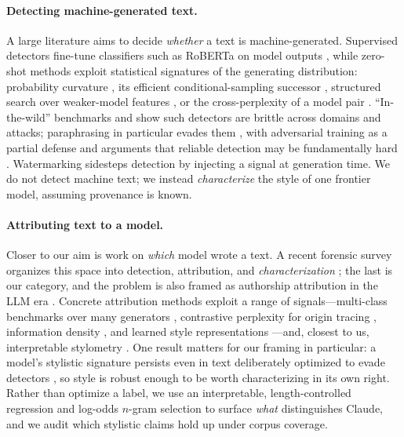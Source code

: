\documentclass[11pt]{article}
\begin{document}
\paragraph{Detecting machine-generated text.}
A large literature aims to decide \emph{whether} a text is machine-generated.
Supervised detectors fine-tune classifiers such as RoBERTa on model outputs
\citep{solaiman2019release}, while zero-shot methods exploit statistical
signatures of the generating distribution: probability curvature
\citep{mitchell2023detectgpt}, its efficient conditional-sampling successor
\citep{bao2024fastdetectgpt}, structured search over weaker-model features
\citep{verma2024ghostbuster}, or the cross-perplexity of a model pair
\citep{hans2024binoculars}. ``In-the-wild'' benchmarks
\citep{li2024mage,wang2024m4} and \citet{dugan2024raid} show such detectors are
brittle across domains and attacks; paraphrasing in particular evades them
\citep{krishna2023dipper}, with adversarial training
\citep{hu2023radar} as a partial defense and arguments that reliable detection
may be fundamentally hard \citep{sadasivan2023reliable}. Watermarking
\citep{kirchenbauer2023watermark} sidesteps detection by injecting a signal at
generation time. We do not detect machine text; we instead \emph{characterize}
the style of one frontier model, assuming provenance is known.

\paragraph{Attributing text to a model.}
Closer to our aim is work on \emph{which} model wrote a text. A recent forensic
survey organizes this space into detection, attribution, and
\emph{characterization} \citep{kumarage2024forensicsurvey}; the last is our
category, and the problem is also framed as authorship attribution in the LLM era
\citep{huang2024authorship}. Concrete attribution methods exploit a range of
signals---multi-class benchmarks over many generators
\citep{uchendu2021turingbench}, contrastive perplexity for origin tracing
\citep{li2023origintracing}, information density \citep{venkatraman2024gptwho}, and
learned style representations \citep{riverasoto2024fewshot}---and, closest to us,
interpretable stylometry \citep{kumarage2023neural}. One result matters for our
framing in particular: a model's stylistic signature persists even in text
deliberately optimized to evade detectors \citep{riverasoto2025fingerprints}, so
style is robust enough to be worth characterizing in its own right. Rather than
optimize a label, we use an interpretable, length-controlled regression and
log-odds $n$-gram selection \citep{monroe2008fightin} to surface \emph{what}
distinguishes Claude, and we audit which stylistic claims hold up under corpus
coverage.
\end{document}
